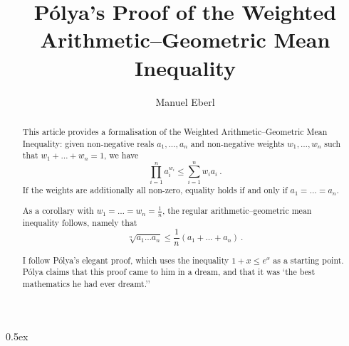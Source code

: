 \documentclass[11pt,a4paper]{article}
\begin{document}
\title{P\'{o}lya's Proof of the Weighted Arithmetic--Geometric Mean Inequality}
\author{Manuel Eberl}
\maketitle

\begin{abstract}
This article provides a formalisation of the Weighted Arithmetic--Geometric Mean Inequality: given non-negative reals $a_1, \ldots, a_n$ and non-negative weights $w_1, \ldots, w_n$ such that $w_1 + \ldots + w_n = 1$, we have
\[\prod\limits_{i=1}^n a_i^{w_i} \leq \sum\limits_{i=1}^n w_i a_i\ .\]
If the weights are additionally all non-zero, equality holds if and only if $a_1 = \ldots = a_n$.

As a corollary with $w_1 = \ldots = w_n = \frac{1}{n}$, the regular arithmetic--geometric mean inequality follows, namely that
\[\sqrt[n]{a_1\ldots a_n} \leq \frac{1}{n}(a_1 + \ldots + a_n)\ .\]

I follow P\'{o}lya's elegant proof, which uses the inequality $1 + x \leq e^x$ as a starting point. P\'{o}lya claims that this proof came to him in a dream, and that it was `the best mathematics he had ever
dreamt.'' \cite[pp.\ 22--26]{steele04}
\end{abstract}

\tableofcontents
\newpage
\parindent 0pt\parskip 0.5ex



\nocite{steele04}


\end{document}
